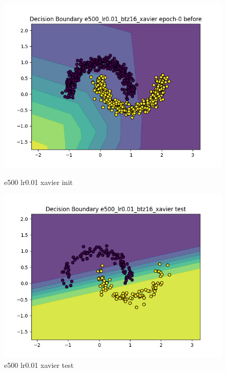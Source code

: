 \documentclass[8pt]{article}
\begin{document}
\begin{figure}[H]
    \centering
    \begin{minipage}{0.32\textwidth}
        \centering
        \includegraphics[width=\textwidth]{../Prob4/out/1024_173617/e500_lr0.01_btz16_xavier/decision_boundary_epoch-0 before.png}
        \caption{e500 lr0.01 xavier init}
        \label{fig:e500 lr0.01 xavier init}
    \end{minipage}
    \begin{minipage}{0.32\textwidth}
        \centering
        \includegraphics[width=\textwidth]{../Prob4/out/1024_173617/e500_lr0.01_btz16_xavier/decision_boundary_test.png}
        \caption{e500 lr0.01 xavier test}
        \label{fig:e500 lr0.01 xavier test}

\end{minipage}
\end{figure}
\end{document}
